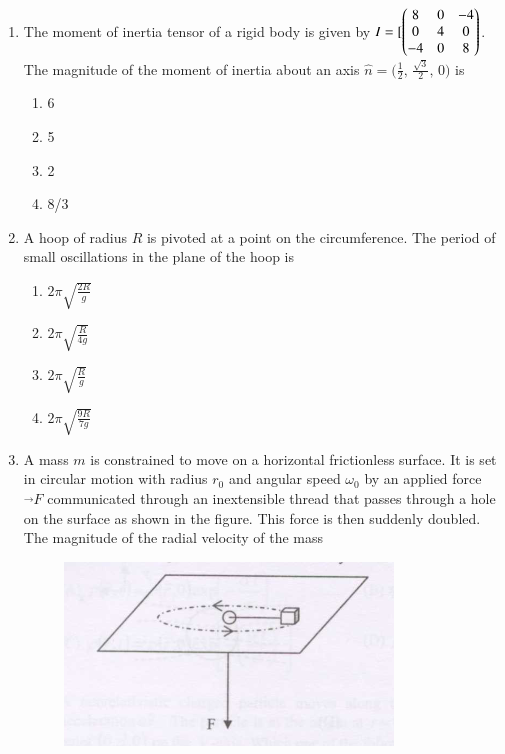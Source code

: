 \documentclass[journal,12pt,onecolumn]{IEEEtran}
\theoremstyle{remark}
\begin{document}
\begin{enumerate}
\item The moment of inertia tensor of a rigid body is given by
$I = [\begin{pmatrix}
8 & 0 & -4 \\
0 & 4 & 0 \\
-4 & 0 & 8\end{pmatrix}
$. The magnitude of the moment of inertia about an axis $\hat{n} = \bigl(\tfrac{1}{2},\,\tfrac{\sqrt{3}}{2},\,0\bigr)$ is
\hfill{}
\begin{multicols}{4}
    \begin{enumerate}
        \item 6
        \item 5
        \item 2
        \item 8/3
    \end{enumerate}
\end{multicols}

\item A hoop of radius $R$ is pivoted at a point on the circumference. The period of small oscillations in the plane of the hoop is  
\hfill{}
\begin{multicols}{4}
\begin{enumerate}
    \item $2\pi \sqrt{\frac{2R}{g}}$
    \item $2\pi \sqrt{\frac{R}{4g}}$
    \item $2\pi \sqrt{\frac{R}{g}}$
    \item $2\pi \sqrt{\frac{9R}{7g}}$
\end{enumerate}
\end{multicols}
\item A mass $m$ is constrained to move on a horizontal frictionless surface. It is set in circular motion with radius $r_{0}$ and angular speed $\omega_{0}$ by an applied force $\overrightarrow{}{F}$ communicated through an inextensible thread that passes through a hole on the surface as shown in the figure. This force is then suddenly doubled. The magnitude of the radial velocity of the mass
\begin{figure}[h!]
    
    \includegraphics[width=0.5\linewidth]{fig/Q.30.png}
    

\end{figure}
\end{enumerate}
\end{document}
